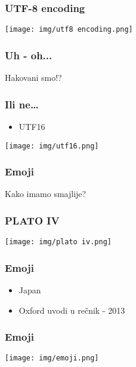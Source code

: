 \documentclass{beamer}
\begin{document}
\begin{frame}
  \frametitle{UTF-8 encoding}
  \begin{center}
    \texttt{[image: img/utf8 encoding.png]}
  \end{center}
\end{frame}

\begin{frame}
  \frametitle{Uh - oh...}
  \begin{center}
    \Huge Hakovani smo!?
  \end{center}
\end{frame}

\begin{frame}
  \frametitle{Ili ne\dots}
  \begin{itemize}
    \item UTF16
  \end{itemize}
  \begin{center}
    \texttt{[image: img/utf16.png]}
  \end{center}
\end{frame}

\begin{frame}
  \frametitle{Emoji}
  \begin{center}
    \Huge Kako imamo smajlije?
  \end{center}
\end{frame}

\begin{frame}
  \frametitle{PLATO IV}
  \begin{center}
    \texttt{[image: img/plato iv.png]}
  \end{center}
\end{frame}

\begin{frame}
  \frametitle{Emoji}
  \begin{itemize}
    \item Japan \newline
    \item Oxford uvodi u rečnik - 2013 \newline
  \end{itemize}
\end{frame}

\begin{frame}
  \frametitle{Emoji}
  \begin{center}
    \texttt{[image: img/emoji.png]}
  \end{center}
\end{frame}
\end{document}
